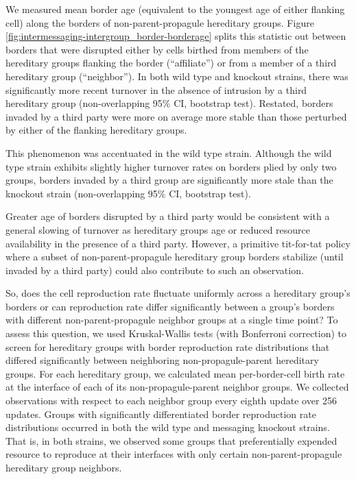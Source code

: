 We measured mean border age (equivalent to the youngest age of either flanking cell) along the borders of non-parent-propagule hereditary groups.
Figure \ref{fig:intermessaging-intergroup_border-borderage} splits this statistic out between borders that were disrupted either by cells birthed from members of the hereditary groups flanking the border (``affiliate'') or from a member of a third hereditary group (``neighbor'').
In both wild type and knockout strains, there was significantly more recent turnover in the absence of intrusion by a third hereditary group (non-overlapping 95\% CI, bootstrap test).
Restated, borders invaded by a third party were more on average more stable than those perturbed by either of the flanking hereditary groups.

This phenomenon was accentuated in the wild type strain.
Although the wild type strain exhibits slightly higher turnover rates on borders plied by only two groups, borders invaded by a third group are significantly more stale than the knockout strain (non-overlapping 95\% CI, bootstrap test).

Greater age of borders disrupted by a third party would be consistent with a general slowing of turnover as hereditary groups age or reduced resource availability in the presence of a third party.
However, a primitive tit-for-tat policy where a subset of non-parent-propagule hereditary group borders stabilize (until invaded by a third party) could also contribute to such an observation.

So, does the cell reproduction rate fluctuate uniformly across a hereditary group's borders or can reproduction rate differ significantly between a group's borders with different non-parent-propagule neighbor groups at a single time point?
To assess this question, we used Kruskal-Wallis tests (with Bonferroni correction) to screen for hereditary groups with border reproduction rate distributions that differed significantly between neighboring non-propagule-parent hereditary groups.
For each hereditary group, we calculated mean per-border-cell birth rate at the interface of each of its non-propagule-parent neighbor groups.
We collected observations with respect to each neighbor group every eighth update over 256 updates.
Groups with significantly differentiated border reproduction rate distributions occurred in both the wild type and messaging knockout strains.
That is, in both strains, we observed some groups that preferentially expended resource to reproduce at their interfaces with only certain non-parent-propagule hereditary group neighbors.

